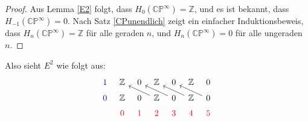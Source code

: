 \documentclass[12pt]{article}
\numberwithin{conj}{section}
\begin{document}
    \begin{proof}
    Aus Lemma \ref{E2} folgt, dass \( H_0(\mathbb{CP}^\infty) = \mathbb{Z} \), und es ist bekannt, dass \( H_{-1}(\mathbb{CP}^\infty) = 0 \). Nach Satz \ref{CPunendlich} zeigt ein einfacher Induktionsbeweis, dass \( H_n(\mathbb{CP}^\infty) = \mathbb{Z} \) für alle geraden \( n \), und \( H_n(\mathbb{CP}^\infty) = 0 \) für alle ungeraden \( n \).
    \end{proof}
    Also sieht $E^2$ wie folgt aus:
    \[\begin{tikzcd}[sep=tiny]
        {\color{blue} 1} & {\mathbb{Z}} & 0 & {\mathbb{Z}} & 0 & {\mathbb{Z}} & 0 \\
        {\color{blue} 0} & {\mathbb{Z}} & 0 & {\mathbb{Z}} & 0 & {\mathbb{Z}} & 0 \\
        & {\color{red} 0} & {\color{red} 1} & {\color{red} 2} & {\color{red} 3} & {\color{red} 4} & {\color{red} 5}
        \arrow[from=2-4, to=1-2]
        \arrow[from=2-5, to=1-3]
        \arrow[from=2-6, to=1-4]
        \arrow[from=2-7, to=1-5]
    \end{tikzcd}\]
    \newpage
    \nocite{*}
    \printbibliography
\end{document}
